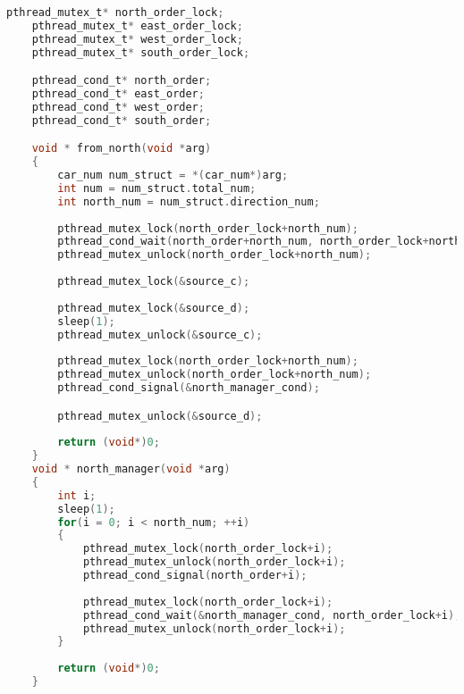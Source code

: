 \documentclass[a4paper,left=2.5cm,right=2.5cm,11pt]{article}
\begin{document}
	\begin{lstlisting}[language = C]
	pthread_mutex_t* north_order_lock;
	pthread_mutex_t* east_order_lock;
	pthread_mutex_t* west_order_lock;
	pthread_mutex_t* south_order_lock;

	pthread_cond_t* north_order;
	pthread_cond_t* east_order;
	pthread_cond_t* west_order;
	pthread_cond_t* south_order;

	void * from_north(void *arg)
	{
		car_num num_struct = *(car_num*)arg;
		int num = num_struct.total_num;
		int north_num = num_struct.direction_num;
		
		pthread_mutex_lock(north_order_lock+north_num);
		pthread_cond_wait(north_order+north_num, north_order_lock+north_num);
		pthread_mutex_unlock(north_order_lock+north_num);
		
		pthread_mutex_lock(&source_c);
		
		pthread_mutex_lock(&source_d);
		sleep(1);
		pthread_mutex_unlock(&source_c);
		
		pthread_mutex_lock(north_order_lock+north_num);
		pthread_mutex_unlock(north_order_lock+north_num);
		pthread_cond_signal(&north_manager_cond);

		pthread_mutex_unlock(&source_d);
		
		return (void*)0;
	}
	void * north_manager(void *arg)
	{
		int i;
		sleep(1);
		for(i = 0; i < north_num; ++i)
		{
			pthread_mutex_lock(north_order_lock+i);
			pthread_mutex_unlock(north_order_lock+i);
			pthread_cond_signal(north_order+i);
			
			pthread_mutex_lock(north_order_lock+i);
			pthread_cond_wait(&north_manager_cond, north_order_lock+i);
			pthread_mutex_unlock(north_order_lock+i);
		}
		
		return (void*)0;
	}
	\end{lstlisting}
\end{document}
